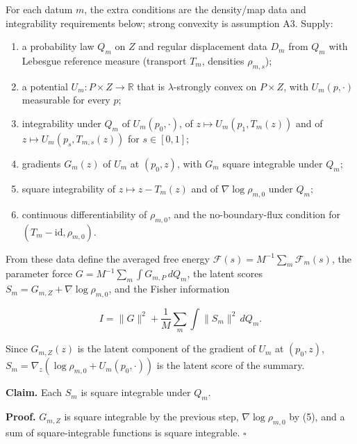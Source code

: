 \documentclass[11pt,a4paper]{report}
\begin{document}
For each datum \(m\), the extra conditions are the density/\allowbreak{}map data and integrability requirements below; strong convexity is assumption A3. Supply:



\begin{enumerate}


\item a probability law \(Q_m\) on \(Z\) and regular displacement data \(D_m\) from \(Q_m\) with Lebesgue reference measure (transport \(T_m\), densities \(\rho_{m,s}\));

\item a potential \(U_m:P\times Z\to\mathbb R\) that is \(\lambda\)-strongly convex on \(P\times Z\), with \(U_m(p,\cdot)\) measurable for every \(p\);

\item integrability under \(Q_m\) of \(U_m(p_0,\cdot)\), of \(z\mapsto U_m(p_1,T_m(z))\) and of \(z\mapsto U_m(p_s,T_{m,s}(z))\) for \(s\in[0,1]\);

\item gradients \(G_m(z)\) of \(U_m\) at \((p_0,z)\), with \(G_m\) square integrable under \(Q_m\);

\item square integrability of \(z\mapsto z-T_m(z)\) and of \(\nabla\log\rho_{m,0}\) under \(Q_m\);

\item continuous differentiability of \(\rho_{m,0}\), and the no-boundary-flux condition for \((T_m-\mathrm{id},\rho_{m,0})\).

\end{enumerate}



From these data define the averaged free energy \(\mathcal F(s)=M^{-1}\sum_m\mathcal F_m(s)\), the parameter force \(G=M^{-1}\sum_m\int G_{m,P}\,dQ_m\), the latent scores \(S_m=G_{m,Z}+\nabla\log\rho_{m,0}\), and the Fisher information


\[I=\|G\|^2+\frac1M\sum_m\int\|S_m\|^2\,dQ_m.\]


Since \(G_{m,Z}(z)\) is the latent component of the gradient of \(U_m\) at \((p_0,z)\), \(S_m=\nabla_z(\log\rho_{m,0}+U_m(p_0,\cdot))\) is the latent score of the summary.




\textbf{Claim.} Each \(S_m\) is square integrable under \(Q_m\).




\textbf{Proof.} \(G_{m,Z}\) is square integrable by the previous step, \(\nabla\log\rho_{m,0}\) by (5), and a sum of square-integrable functions is square integrable. \(\square\)
\end{document}
